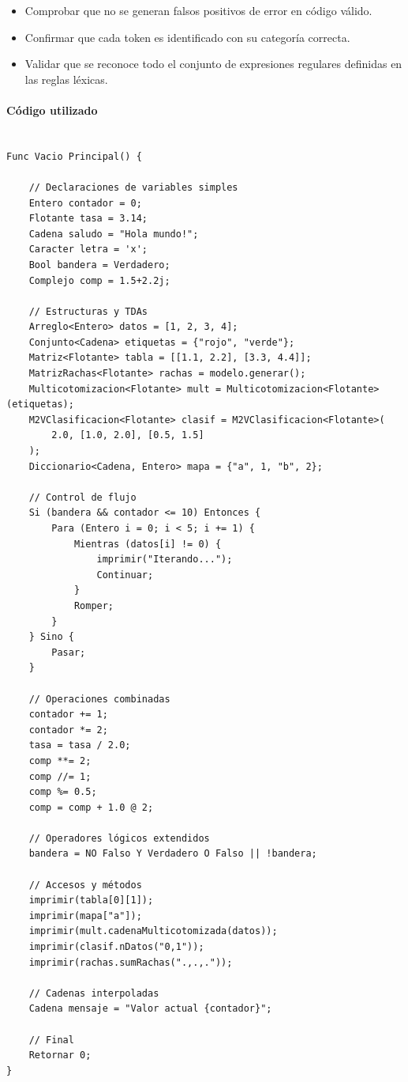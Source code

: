 \documentclass{article}
\begin{document}
\begin{itemize}
  \item Comprobar que no se generan falsos positivos de error en código válido.
  \item Confirmar que cada token es identificado con su categoría correcta.
  \item Validar que se reconoce todo el conjunto de expresiones regulares definidas en las reglas léxicas.
\end{itemize}

\paragraph{Código utilizado}

\begin{lstlisting}[style=mypython, caption={Programa completo con todas las categorías léxicas}]
  
Func Vacio Principal() {

    // Declaraciones de variables simples
    Entero contador = 0;
    Flotante tasa = 3.14;
    Cadena saludo = "Hola mundo!";
    Caracter letra = 'x';
    Bool bandera = Verdadero;
    Complejo comp = 1.5+2.2j;

    // Estructuras y TDAs
    Arreglo<Entero> datos = [1, 2, 3, 4];
    Conjunto<Cadena> etiquetas = {"rojo", "verde"};
    Matriz<Flotante> tabla = [[1.1, 2.2], [3.3, 4.4]];
    MatrizRachas<Flotante> rachas = modelo.generar();
    Multicotomizacion<Flotante> mult = Multicotomizacion<Flotante>(etiquetas);
    M2VClasificacion<Flotante> clasif = M2VClasificacion<Flotante>(
        2.0, [1.0, 2.0], [0.5, 1.5]
    );
    Diccionario<Cadena, Entero> mapa = {"a", 1, "b", 2};

    // Control de flujo
    Si (bandera && contador <= 10) Entonces {
        Para (Entero i = 0; i < 5; i += 1) {
            Mientras (datos[i] != 0) {
                imprimir("Iterando...");
                Continuar;
            }
            Romper;
        }
    } Sino {
        Pasar;
    }

    // Operaciones combinadas
    contador += 1;
    contador *= 2;
    tasa = tasa / 2.0;
    comp **= 2;
    comp //= 1;
    comp %= 0.5;
    comp = comp + 1.0 @ 2;

    // Operadores lógicos extendidos
    bandera = NO Falso Y Verdadero O Falso || !bandera;

    // Accesos y métodos
    imprimir(tabla[0][1]);
    imprimir(mapa["a"]);
    imprimir(mult.cadenaMulticotomizada(datos));
    imprimir(clasif.nDatos("0,1"));
    imprimir(rachas.sumRachas(".,.,."));

    // Cadenas interpoladas
    Cadena mensaje = "Valor actual {contador}";

    // Final
    Retornar 0;
}

\end{lstlisting}
\end{document}
